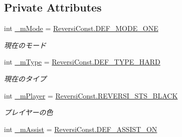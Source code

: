 \subsection*{Private Attributes}
\begin{DoxyCompactItemize}
\item 
\mbox{\label{class_reversi_wpf_1_1_reversi_setting_ada23ff63b62ae69e7323b40ad8dab181}} 
int \hyperlink{class_reversi_wpf_1_1_reversi_setting_ada23ff63b62ae69e7323b40ad8dab181}{\+\_\+m\+Mode} = \hyperlink{class_reversi_wpf_1_1_reversi_const_ad04dea7565de44d16a967772a5d35a04}{Reversi\+Const.\+D\+E\+F\+\_\+\+M\+O\+D\+E\+\_\+\+O\+NE}
\begin{DoxyCompactList}\small\item\em 現在のモード \end{DoxyCompactList}\item 
\mbox{\label{class_reversi_wpf_1_1_reversi_setting_ad85b080967f4395a1ac676c8a78f6aca}} 
int \hyperlink{class_reversi_wpf_1_1_reversi_setting_ad85b080967f4395a1ac676c8a78f6aca}{\+\_\+m\+Type} = \hyperlink{class_reversi_wpf_1_1_reversi_const_a11d023b81712bc360e92a742c836013d}{Reversi\+Const.\+D\+E\+F\+\_\+\+T\+Y\+P\+E\+\_\+\+H\+A\+RD}
\begin{DoxyCompactList}\small\item\em 現在のタイプ \end{DoxyCompactList}\item 
\mbox{\label{class_reversi_wpf_1_1_reversi_setting_a03e179f0b7d57b41d6c1604a51767d9f}} 
int \hyperlink{class_reversi_wpf_1_1_reversi_setting_a03e179f0b7d57b41d6c1604a51767d9f}{\+\_\+m\+Player} = \hyperlink{class_reversi_wpf_1_1_reversi_const_af8b45bee14a58661368c5bc07c144463}{Reversi\+Const.\+R\+E\+V\+E\+R\+S\+I\+\_\+\+S\+T\+S\+\_\+\+B\+L\+A\+CK}
\begin{DoxyCompactList}\small\item\em プレイヤーの色 \end{DoxyCompactList}\item 
\mbox{\label{class_reversi_wpf_1_1_reversi_setting_a5beec12ea3a8cccd45aa4e949c273399}} 
int \hyperlink{class_reversi_wpf_1_1_reversi_setting_a5beec12ea3a8cccd45aa4e949c273399}{\+\_\+m\+Assist} = \hyperlink{class_reversi_wpf_1_1_reversi_const_ac6df5bd2e5278bc4fbcf950e1ac6c733}{Reversi\+Const.\+D\+E\+F\+\_\+\+A\+S\+S\+I\+S\+T\+\_\+\+ON}

\end{DoxyCompactItemize}
